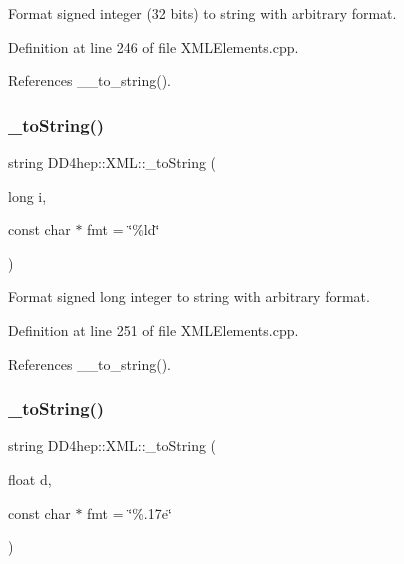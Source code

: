 Format signed integer (32 bits) to string with arbitrary format. 



Definition at line 246 of file X\+M\+L\+Elements.\+cpp.



References \+\_\+\+\_\+to\+\_\+string().

\hypertarget{group___d_d4_h_e_p___x_m_l_gab11cb9a1d8aa1ca280f2d88345983838}{}\label{group___d_d4_h_e_p___x_m_l_gab11cb9a1d8aa1ca280f2d88345983838} 
\subsubsection{\texorpdfstring{\+\_\+to\+String()}{\_toString()}\hspace{0.1cm}{\footnotesize\ttfamily [8/12]}}
{\footnotesize\ttfamily string D\+D4hep\+::\+X\+M\+L\+::\+\_\+to\+String (\begin{DoxyParamCaption}\item[{long}]{i,  }\item[{const char $\ast$}]{fmt = {\ttfamily \char`\"{}\%ld\char`\"{}} }\end{DoxyParamCaption})}



Format signed long integer to string with arbitrary format. 



Definition at line 251 of file X\+M\+L\+Elements.\+cpp.



References \+\_\+\+\_\+to\+\_\+string().

\hypertarget{group___d_d4_h_e_p___x_m_l_ga5fe476c5280899829d9defb4386524a9}{}\label{group___d_d4_h_e_p___x_m_l_ga5fe476c5280899829d9defb4386524a9} 
\subsubsection{\texorpdfstring{\+\_\+to\+String()}{\_toString()}\hspace{0.1cm}{\footnotesize\ttfamily [9/12]}}
{\footnotesize\ttfamily string D\+D4hep\+::\+X\+M\+L\+::\+\_\+to\+String (\begin{DoxyParamCaption}\item[{float}]{d,  }\item[{const char $\ast$}]{fmt = {\ttfamily \char`\"{}\%.17e\char`\"{}} }\end{DoxyParamCaption})}



